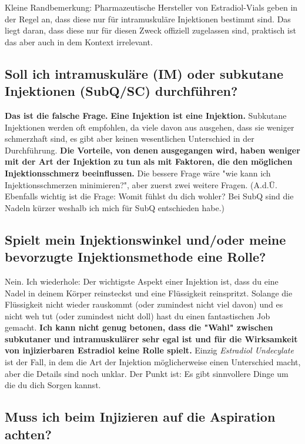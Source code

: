 \documentclass{article}
\begin{document}
Kleine Randbemerkung: Pharmazeutische Hersteller von Estradiol-Vials geben in der Regel an, dass diese nur für intramuskuläre Injektionen bestimmt sind. Das liegt daran, dass diese nur für diesen Zweck offiziell zugelassen sind, praktisch ist das aber auch in dem Kontext irrelevant. 

\subsection{Soll ich intramuskuläre (IM) oder subkutane Injektionen (SubQ/SC) durchführen?}

\textbf{Das ist die falsche Frage.} \textbf{Eine Injektion ist eine Injektion.} Subkutane Injektionen werden oft empfohlen, da viele davon aus ausgehen, dass sie weniger schmerzhaft sind, es gibt aber keinen wesentlichen Unterschied in der Durchführung. \textbf{Die Vorteile, von denen ausgegangen wird, haben weniger mit der Art der Injektion zu tun als mit Faktoren, die den möglichen Injektionsschmerz beeinflussen.} Die bessere Frage wäre "wie kann ich Injektionsschmerzen minimieren?", aber zuerst zwei weitere Fragen. (A.d.Ü. Ebenfalls wichtig ist die Frage: Womit fühlst du dich wohler? Bei SubQ sind die Nadeln kürzer weshalb ich mich für SubQ entschieden habe.)

\subsection{Spielt mein Injektionswinkel und/oder meine bevorzugte Injektionsmethode eine Rolle?}

Nein. Ich wiederhole: Der wichtigste Aspekt einer Injektion ist, dass du eine Nadel in deinem Körper reinsteckst und eine Flüssigkeit reinspritzt. Solange die Flüssigkeit nicht wieder rauskommt (oder zumindest nicht viel davon) und es nicht weh tut (oder zumindest nicht doll) hast du einen fantastischen Job gemacht. \textbf{Ich kann nicht genug betonen, dass die "Wahl" zwischen subkutaner und intramuskulärer sehr egal ist und für die Wirksamkeit von injizierbaren Estradiol keine Rolle spielt.} Einzig \textit{Estradiol Undecylate} ist der Fall, in dem die Art der Injektion möglicherweise einen Unterschied macht, aber die Details sind noch unklar. Der Punkt ist: Es gibt sinnvollere Dinge um die du dich Sorgen kannst.

\subsection{Muss ich beim Injizieren auf die Aspiration achten?}
\end{document}
